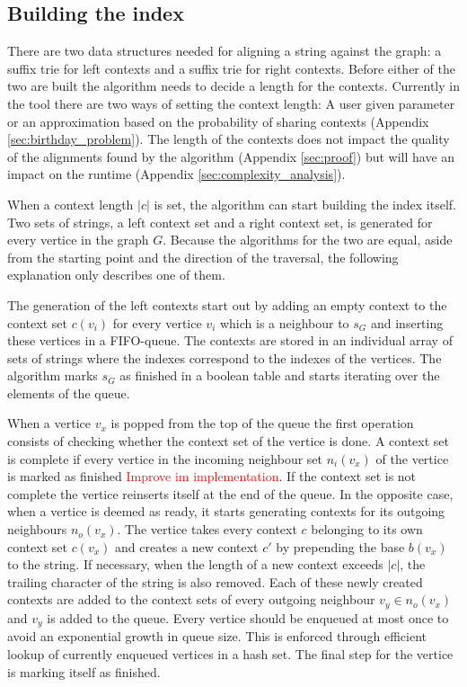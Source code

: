 \documentclass[thesis.tex]{subfiles}
\begin{document}
\subsection{Building the index}
There are two data structures needed for aligning a string against the graph: a suffix trie for left contexts and a suffix trie for right contexts. Before either of the two are built the algorithm needs to decide a length for the contexts. Currently in the tool there are two ways of setting the context length: A user given parameter or an approximation based on the probability of sharing contexts (Appendix \ref{sec:birthday_problem}). The length of the contexts does not impact the quality of the alignments found by the algorithm (Appendix \ref{sec:proof}) but will have an impact on the runtime (Appendix \ref{sec:complexity_analysis}).\\
\par\noindent
When a context length $|c|$ is set, the algorithm can start building the index itself. Two sets of strings, a left context set and a right context set, is generated for every vertice in the graph $G$. Because the algorithms for the two are equal, aside from the starting point and the direction of the traversal, the following explanation only describes one of them.\\
\par\noindent
The generation of the left contexts start out by adding an empty context to the context set $c(v_i)$ for every vertice $v_i$ which is a neighbour to $s_G$ and inserting these vertices in a FIFO-queue. The contexts are stored in an individual array of sets of strings where the indexes correspond to the indexes of the vertices. The algorithm marks $s_G$ as finished in a boolean table and starts iterating over the elements of the queue.\\
\par\noindent
When a vertice $v_x$ is popped from the top of the queue the first operation consists of checking whether the context set of the vertice is done. A context set is complete if every vertice in the incoming neighbour set $n_i(v_x)$ of the vertice is marked as finished \textcolor{red}{Improve im implementation}. If the context set is not complete the vertice reinserts itself at the end of the queue. In the opposite case, when a vertice is deemed as ready, it starts generating contexts for its outgoing neighbours $n_o(v_x)$. The vertice takes every context $c$ belonging to its own context set $c(v_x)$ and creates a new context $c'$ by prepending the base $b(v_x)$ to the string. If necessary, when the length of a new context exceeds $|c|$, the trailing character of the string is also removed. Each of these newly created contexts are added to the context sets of every outgoing neighbour $v_y \in n_o(v_x)$ and $v_y$ is added to the queue. Every vertice should be enqueued at most once to avoid an exponential growth in queue size. This is enforced through efficient lookup of currently enqueued vertices in a hash set. The final step for the vertice is marking itself as finished.\\
\end{document}
